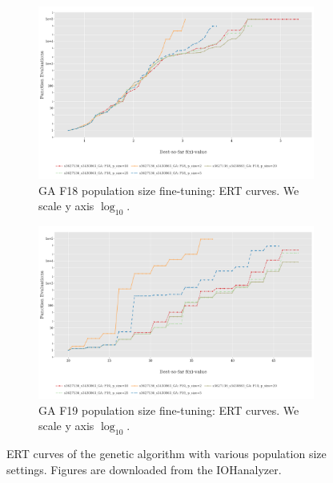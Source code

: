 \documentclass{article}
\begin{document}
\begin{figure}[!ht]
    \centering
    \begin{subfigure}[h]{0.95\linewidth}
        \includegraphics[width=\linewidth]{ga/f18/psize_ert.png}
        \caption{GA F18 population size fine-tuning: ERT curves. We scale y axis $\log_{10}$.}
    \end{subfigure}
    \hfill
    \begin{subfigure}[h]{0.95\linewidth}
        \includegraphics[width=\linewidth]{ga/f19/psize_ert.png}
        \caption{GA F19 population size fine-tuning: ERT curves. We scale y axis $\log_{10}$.}
    \end{subfigure}
    \caption{ERT curves of the genetic algorithm with various population size settings. Figures are downloaded from the IOHanalyzer.}
    \label{fig:experi-ga-psize-ert}
\end{figure}
\end{document}
